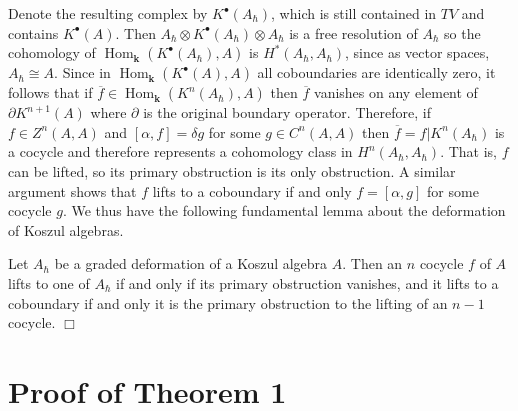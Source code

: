\documentclass{amsart}
\begin{document}
Denote the resulting complex by $K^{\bullet}(A_{\hbar})$, which is still contained in $TV$ and contains $K^{\bullet}(A)$.  Then $A_{\hbar}\otimes K^{\bullet}(A_{\hbar})\otimes A_{\hbar}$ is a free resolution of  $A_{\hbar}$ so the cohomology of $\operatorname{Hom}_{\ensuremath{\mathbf{k}}}(K^{\bullet}(A_{\hbar}), A)$ is $H^*(A_{\hbar}, A_{\hbar})$, since as  vector spaces, $A_{\hbar} \cong A$.  Since in $\operatorname{Hom}_{\ensuremath{\mathbf{k}}}(K^{\bullet}(A), A)$ all coboundaries are identically
zero, it follows that if ${\overline f} \in \operatorname{Hom}_{\ensuremath{\mathbf{k}}}(K^n(A_{\hbar}), A)$ then ${\overline f}$ vanishes on any element of $\partial K^{n+1}(A)$ where $\partial$ is the original boundary operator.
Therefore, if $f \in Z^n(A,A)$ and $[\alpha, f] = \delta g$ for some $g \in C^n(A,A)$ then ${\overline f} = f| K^n(A_{\hbar})$ is a cocycle and therefore represents a cohomology class in $H^n(A_{\hbar}, A_{\hbar})$. That is, $f$ can be lifted, so its primary obstruction is its only obstruction. A similar argument shows that $f$ lifts to a coboundary if and only $f = [\alpha, g]$ for some cocycle $g$. We thus have the following fundamental lemma about the deformation of Koszul algebras.
\begin{lemma}\label{Klift}
Let $A_{\hbar}$ be a graded deformation of a Koszul algebra $A$. Then an $n$ cocycle $f$ of $A$ lifts to one of $A_{\hbar}$ if and only if its primary obstruction vanishes, and it lifts to a coboundary if and only it is the primary obstruction to the lifting of an $n-1$ cocycle. $\Box$
\end{lemma}

\section{Proof of Theorem 1}
\end{document}
